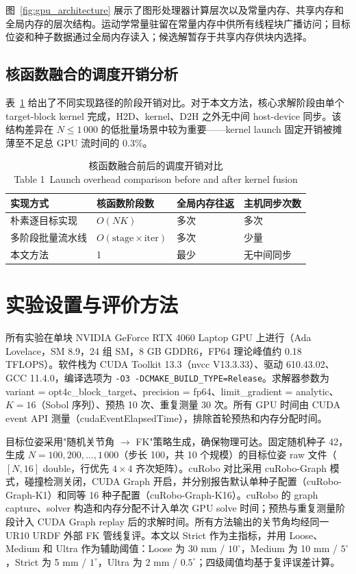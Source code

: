 \documentclass[twocolumn,a4paper,10pt]{ctexart}
\begin{document}
图~\ref{fig:gpu_architecture} 展示了图形处理器计算层次以及常量内存、共享内存和全局内存的层次结构。运动学常量驻留在常量内存中供所有线程块广播访问；目标位姿和种子数据通过全局内存读入；候选解暂存于共享内存供块内选择。

\subsection{核函数融合的调度开销分析}

表~\ref{tab:launch} 给出了不同实现路径的阶段开销对比。对于本文方法，核心求解阶段由单个 target-block kernel 完成，H2D、kernel、D2H 之外无中间 host-device 同步。该结构差异在 $N\le1\,000$ 的低批量场景中较为重要——kernel launch 固定开销被摊薄至不足总 GPU 流时间的 0.3\%。

\begin{table}[htbp]
\centering
\caption{核函数融合前后的调度开销对比\\[2pt] {\small Table 1~Launch overhead comparison before and after kernel fusion}}
\label{tab:launch}
\scriptsize
\setlength{\tabcolsep}{2pt}
\begin{tabular}{p{2.0cm}p{1.45cm}p{1.25cm}p{1.15cm}}
\toprule
实现方式 & 核函数阶段数 & 全局内存往返 & 主机同步次数\\
\midrule
朴素逐目标实现 & $O(NK)$ & 多次 & 多次\\
多阶段批量流水线 & $O(\mathrm{stage}\times\mathrm{iter})$ & 多次 & 少量\\
本文方法 & 1 & 最少 & 无中间同步\\
\bottomrule
\end{tabular}
\end{table}

\section{实验设置与评价方法}

所有实验在单块 NVIDIA GeForce RTX 4060 Laptop GPU 上进行（Ada Lovelace，SM 8.9，24 组 SM，8 GB GDDR6，FP64 理论峰值约 0.18 TFLOPS）。软件栈为 CUDA Toolkit 13.3（nvcc V13.3.33）、驱动 610.43.02、GCC 11.4.0，编译选项为 \texttt{-O3 -DCMAKE\_BUILD\_TYPE=Release}。求解器参数为 variant = opt4c\_block\_target、precision = fp64、limit\_gradient = analytic、$K=16$（Sobol 序列\cite{sobol1967}）、预热 10 次、重复测量 30 次。所有 GPU 时间由 CUDA event API 测量（cudaEventElapsedTime），排除首轮预热和内存分配时间。

目标位姿采用"随机关节角 $\to$ FK"策略生成，确保物理可达。固定随机种子 42，生成 $N=100,200,\dots,1\,000$（步长 100，共 10 个规模）的目标位姿 raw 文件（$[N,16]$ double，行优先 $4\times4$ 齐次矩阵）。cuRobo 对比采用 cuRobo-Graph 模式，碰撞检测关闭，CUDA Graph 开启，并分别报告默认单种子配置（cuRobo-Graph-K1）和同等 16 种子配置（cuRobo-Graph-K16）。cuRobo 的 graph capture、solver 构造和内存分配不计入单次 GPU solve 时间；预热与重复测量阶段计入 CUDA Graph replay 后的求解时间。所有方法输出的关节角均经同一 UR10 URDF 外部 FK 管线复评。本文以 Strict 作为主指标，并用 Loose、Medium 和 Ultra 作为辅助阈值：Loose 为 30 mm / $10^\circ$，Medium 为 10 mm / $5^\circ$，Strict 为 5 mm / $1^\circ$，Ultra 为 2 mm / $0.5^\circ$；四级阈值均基于复评误差计算。
\end{document}
